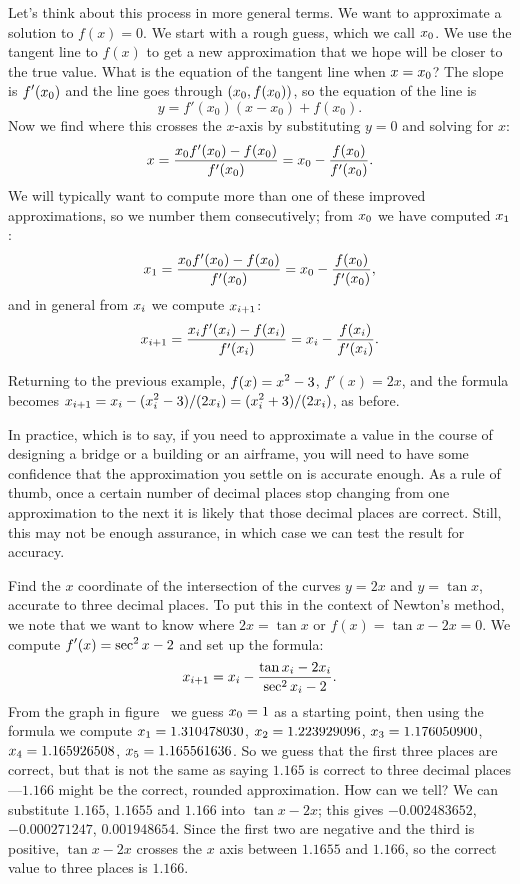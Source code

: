 Let's think about this process in more general terms. We want to
approximate a solution to $f(x)=0$.
We start with a rough guess, which we call $\displaystyle x_0$.  We use the tangent
line to $f(x)$ to get a new approximation that we hope will be closer
to the true value. What is the equation of the tangent line when
$\displaystyle x=x_0$? The slope is $\displaystyle f'(x_0)$ and the line goes through
$\displaystyle(x_0,f(x_0))$, so the equation of the line is
$$ y=f'(x_0)(x-x_0)+f(x_0).$$
Now we find where this crosses the $x$-axis by substituting $y=0$ and
solving for $x$:
$$x={x_0f'(x_0)-f(x_0)\over f'(x_0)} = x_0 - {f(x_0)\over f'(x_0)}.$$
We will typically want to compute more than one of these improved
approximations, so we number them consecutively; from $\displaystyle x_0$ we have
computed $\displaystyle x_1$:
$$x_1={x_0f'(x_0)-f(x_0)\over f'(x_0)} = x_0 - {f(x_0)\over f'(x_0)},$$
and in general from $\displaystyle x_i$ we compute $\displaystyle x_{i+1}$:
$$x_{i+1}={x_if'(x_i)-f(x_i)\over f'(x_i)} = x_i - {f(x_i)\over f'(x_i)}.$$

\example
Returning to the previous example, $\displaystyle f(x)=x^2-3$, $f'(x)=2x$, and the
formula becomes $\displaystyle x_{i+1}=x_i - (x_i^2-3)/(2x_i)=(x_i^2+3)/(2x_i)$, as
before.
\endexample

In practice, which is to say, if you need to approximate a value in
the course of designing a bridge or a building or an airframe, you
will need to have some confidence that the approximation you settle on
is accurate enough. As a rule of thumb, once a certain number of
decimal places stop changing from one approximation to the next it is
likely that those decimal places are correct. Still, this may not be
enough assurance, in which case we can test the result for accuracy.

\example Find the $x$ coordinate of the intersection of the curves $y=2x$
and $y=\tan x$, accurate to three decimal places. To put this in the
context of Newton's method, we note that we want to know where $2x=\tan
x$ or $f(x)=\tan x-2x=0$. We compute $\displaystyle f'(x)=\sec^2 x - 2$ and set up the
formula:
$$x_{i+1} = x_i-{\tan x_i -2x_i\over \sec^2 x_i - 2}.$$ From the graph
in figure~ 
we guess $\displaystyle x_0=1$ as a starting point, then using the formula we
compute $\displaystyle x_1=1.310478030$, $\displaystyle x_2=1.223929096$, $\displaystyle x_3=1.176050900$,
$\displaystyle x_4=1.165926508$, $\displaystyle x_5=1.165561636$.  So we guess that the first
three places are correct, but that is not the same as saying $1.165$
is correct to three decimal places---$1.166$ might be the correct,
rounded approximation. How can we tell? We can substitute $1.165$,
$1.1655$ and $1.166$ into $\tan x - 2x$; this
gives $-0.002483652$, $-0.000271247$, $0.001948654$. Since the first
two are negative and the third is positive, $\tan x - 2x$ crosses the
$x$ axis between $1.1655$ and $1.166$, so the correct value to three
places is $1.166$.
\endexample

